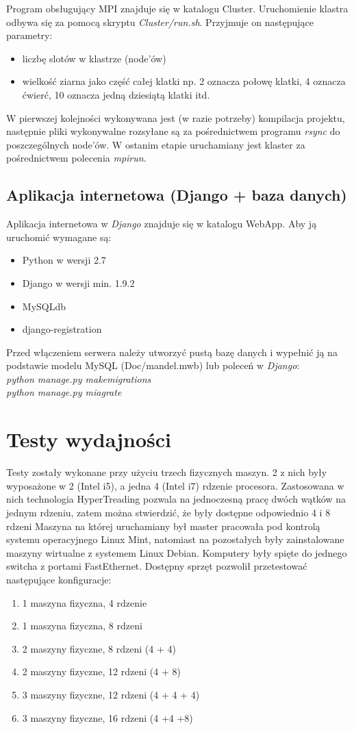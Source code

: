 \documentclass[a4paper]{article}
\begin{document}
Program obsługujący MPI znajduje się w katalogu Cluster. Uruchomienie klastra odbywa się za pomocą skryptu \textit{Cluster/run.sh}. Przyjmuje on następujące parametry:
\begin{itemize}
\item liczbę slotów w klastrze (node’ów)
\item wielkość ziarna jako część całej klatki np. 2 oznacza połowę klatki, 4 oznacza ćwierć, 10 oznacza jedną dziesiątą klatki itd.
\end{itemize}
W pierwszej kolejności wykonywana jest (w razie potrzeby) kompilacja projektu, następnie pliki wykonywalne rozsyłane są za pośrednictwem programu \textit{rsync} do poszczególnych node'ów. W ostanim etapie uruchamiany jest klaster za pośrednictwem polecenia \textit{mpirun}.

\subsection{Aplikacja internetowa (Django + baza danych)}
Aplikacja internetowa w \textit{Django} znajduje się w katalogu WebApp. Aby ją uruchomić wymagane są:
\begin{itemize}
\item Python w wersji 2.7
\item Django w wersji min. 1.9.2
\item MySQLdb
\item django-registration
\end{itemize}
Przed włączeniem serwera należy utworzyć pustą bazę danych i wypełnić ją na podstawie modelu MySQL (Doc/mandel.mwb) lub poleceń w \textit{Django}:\\
\textit{python manage.py makemigrations\\
python manage.py miagrate}

\newpage

\section{Testy wydajności}
Testy zostały wykonane przy użyciu trzech fizycznych maszyn. 2 z nich były wyposażone w 2 (Intel i5), a jedna 4 (Intel i7) rdzenie procesora. Zastosowana w nich technologia HyperTreading pozwala na jednoczesną pracę dwóch wątków na jednym rdzeniu, zatem można stwierdzić, że były dostępne odpowiednio 4 i 8 rdzeni Maszyna na której uruchamiany był master pracowała pod kontrolą systemu operacyjnego Linux Mint, natomiast na pozostałych były zainstalowane maszyny wirtualne z systemem Linux Debian. Komputery były spięte do jednego switcha z portami FastEthernet. Dostępny sprzęt pozwolił przetestować następujące konfiguracje:
\begin{enumerate}
\item 1 maszyna fizyczna, 4 rdzenie
\item 1 maszyna fizyczna, 8 rdzeni
\item 2 maszyny fizyczne, 8 rdzeni (4 + 4)
\item 2 maszyny fizyczne, 12 rdzeni (4 + 8)
\item 3 maszyny fizyczne, 12 rdzeni (4 + 4 + 4)
\item 3 maszyny fizyczne, 16 rdzeni (4 +4 +8)
\end{enumerate}
\end{document}
